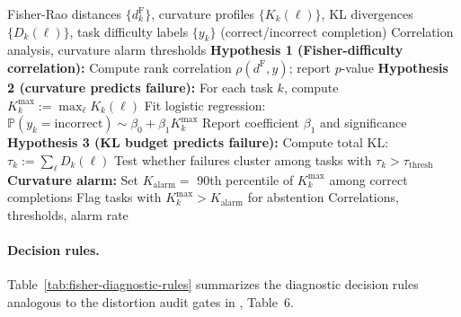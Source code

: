 \documentclass[11pt]{article}
\newcommand{\Prob}{\mathbb{P}}
\theoremstyle{remark}
\begin{document}
\begin{algorithm}[H]
\caption{Fisher Curvature Diagnostic for Completion Tasks}
\label{alg:fisher-diagnostic}
\begin{algorithmic}[1]
\Require Fisher-Rao distances $\{d_k^{\mathrm{F}}\}$, curvature profiles
$\{K_k(\ell)\}$, KL divergences $\{D_k(\ell)\}$, task difficulty labels
$\{y_k\}$ (correct/incorrect completion)
\Ensure Correlation analysis, curvature alarm thresholds
\State \textbf{Hypothesis 1 (Fisher-difficulty correlation):}
\State \quad Compute rank correlation $\rho(d^{\mathrm{F}}, y)$; report $p$-value
\State \textbf{Hypothesis 2 (curvature predicts failure):}
\State \quad For each task $k$, compute
$K_k^{\max} := \max_\ell K_k(\ell)$
\State \quad Fit logistic regression: $\Prob(y_k = \text{incorrect})
\sim \beta_0 + \beta_1 K_k^{\max}$
\State \quad Report coefficient $\beta_1$ and significance
\State \textbf{Hypothesis 3 (KL budget predicts failure):}
\State \quad Compute total KL: $\tau_k := \sum_\ell D_k(\ell)$
\State \quad Test whether failures cluster among tasks with $\tau_k > \tau_{\mathrm{thresh}}$
\State \textbf{Curvature alarm:}
\State \quad Set $K_{\mathrm{alarm}} = $ 90th percentile of $K_k^{\max}$
among correct completions
\State \quad Flag tasks with $K_k^{\max} > K_{\mathrm{alarm}}$ for abstention
\State \Return Correlations, thresholds, alarm rate
\end{algorithmic}
\end{algorithm}

\paragraph{Decision rules.}
Table~\ref{tab:fisher-diagnostic-rules} summarizes the diagnostic decision rules
analogous to the distortion audit gates in \cite{davis2025manifold},
Table~6.
\end{document}
